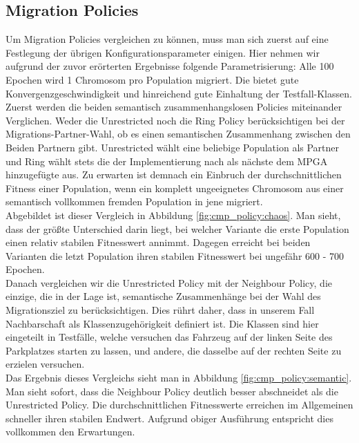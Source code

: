 \documentclass[12pt,a4paper]{article}
\begin{document}
\subsection{Migration Policies}
Um Migration Policies vergleichen zu können, muss man sich zuerst auf eine Festlegung der übrigen Konfigurationsparameter einigen. Hier nehmen wir aufgrund der zuvor erörterten Ergebnisse folgende Parametrisierung: Alle 100 Epochen wird 1 Chromosom pro Population migriert. Die bietet gute Konvergenzgeschwindigkeit und hinreichend gute Einhaltung der Testfall-Klassen.\\
Zuerst werden die beiden semantisch zusammenhangslosen Policies miteinander Verglichen. Weder die Unrestricted noch die Ring Policy berücksichtigen bei der Migrations-Partner-Wahl, ob es einen semantischen Zusammenhang zwischen den Beiden Partnern gibt. Unrestricted wählt eine beliebige Population als Partner und Ring wählt stets die der Implementierung nach als nächste dem MPGA hinzugefügte aus. Zu erwarten ist demnach ein Einbruch der durchschnittlichen Fitness einer Population, wenn ein komplett ungeeignetes Chromosom aus einer semantisch vollkommen fremden Population in jene migriert.\\
Abgebildet ist dieser Vergleich in Abbildung \ref{fig:cmp_policy:chaos}. Man sieht, dass der größte Unterschied darin liegt, bei welcher Variante die erste Population einen relativ stabilen Fitnesswert annimmt. Dagegen erreicht bei beiden Varianten die letzt Population ihren stabilen Fitnesswert bei ungefähr 600 - 700 Epochen.\\
Danach vergleichen wir die Unrestricted Policy mit der Neighbour Policy, die einzige, die in der Lage ist, semantische Zusammenhänge bei der Wahl des Migrationsziel zu berücksichtigen. Dies rührt daher, dass in unserem Fall Nachbarschaft als Klassenzugehörigkeit definiert ist. Die Klassen sind hier eingeteilt in Testfälle, welche versuchen das Fahrzeug auf der linken Seite des Parkplatzes starten zu lassen, und andere, die dasselbe auf der rechten Seite zu erzielen versuchen.\\
Das Ergebnis dieses Vergleichs sieht man in Abbildung \ref{fig:cmp_policy:semantic}. Man sieht sofort, dass die Neighbour Policy deutlich besser abschneidet als die Unrestricted Policy. Die durchschnittlichen Fitnesswerte erreichen im Allgemeinen schneller ihren stabilen Endwert. Aufgrund obiger Ausführung entspricht dies vollkommen den Erwartungen.
\end{document}
